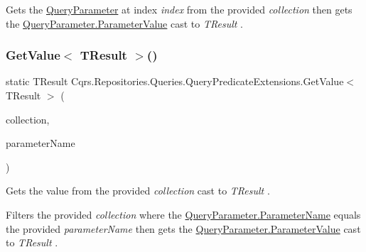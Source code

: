 Gets the \hyperlink{classCqrs_1_1Repositories_1_1Queries_1_1QueryParameter}{Query\+Parameter} at index {\itshape index}  from the provided {\itshape collection}  then gets the \hyperlink{classCqrs_1_1Repositories_1_1Queries_1_1QueryParameter_a0d1c69ffc864aeda2eb515a9e57fbd7a_a0d1c69ffc864aeda2eb515a9e57fbd7a}{Query\+Parameter.\+Parameter\+Value} cast to {\itshape T\+Result} . \mbox{\label{classCqrs_1_1Repositories_1_1Queries_1_1QueryPredicateExtensions_a8ede744015309723a289ace4795ba14a_a8ede744015309723a289ace4795ba14a}} 
\subsubsection{\texorpdfstring{Get\+Value$<$ T\+Result $>$()}{GetValue< TResult >()}\hspace{0.1cm}{\footnotesize\ttfamily [7/7]}}
{\footnotesize\ttfamily static T\+Result Cqrs.\+Repositories.\+Queries.\+Query\+Predicate\+Extensions.\+Get\+Value$<$ T\+Result $>$ (\begin{DoxyParamCaption}\item[{this Sorted\+Set$<$ \hyperlink{classCqrs_1_1Repositories_1_1Queries_1_1QueryParameter}{Query\+Parameter} $>$}]{collection,  }\item[{string}]{parameter\+Name }\end{DoxyParamCaption})\hspace{0.3cm}{\ttfamily [static]}}



Gets the value from the provided {\itshape collection}  cast to {\itshape T\+Result} . 

Filters the provided {\itshape collection}  where the \hyperlink{classCqrs_1_1Repositories_1_1Queries_1_1QueryParameter_a9e2242ad5acffe4e99d4945e4b88be8d_a9e2242ad5acffe4e99d4945e4b88be8d}{Query\+Parameter.\+Parameter\+Name} equals the provided {\itshape parameter\+Name}  then gets the \hyperlink{classCqrs_1_1Repositories_1_1Queries_1_1QueryParameter_a0d1c69ffc864aeda2eb515a9e57fbd7a_a0d1c69ffc864aeda2eb515a9e57fbd7a}{Query\+Parameter.\+Parameter\+Value} cast to {\itshape T\+Result} . 